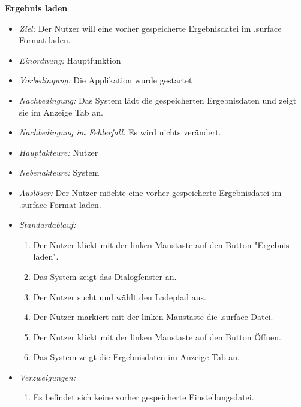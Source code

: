 \textbf{Ergebnis laden}
  \begin{itemize}
  \item \textit{Ziel:} Der Nutzer will eine vorher gespeicherte Ergebnisdatei im .surface Format laden.
  \item \textit{Einordnung:} Hauptfunktion
  \item \textit{Vorbedingung:} Die Applikation wurde gestartet
  \item \textit{Nachbedingung:} Das System l\"adt die gespeicherten Ergebnisdaten und zeigt sie im Anzeige Tab an.
    \item \textit{Nachbedingung im Fehlerfall:} Es wird nichts ver\"andert.
  \item \textit{Hauptakteure:} Nutzer
  \item \textit{Nebenakteure:} System
  \item \textit{Ausl\"oser:} Der Nutzer m\"ochte eine vorher gespeicherte Ergebnisdatei im .surface Format laden.
    \item \textit{Standardablauf:}
    \begin{enumerate}
    \item Der Nutzer klickt mit der linken Maustaste auf den Button "Ergebnis laden".
    \item Das System zeigt das Dialogfenster an.
    \item Der Nutzer sucht und w\"ahlt den Ladepfad aus.
    \item Der Nutzer markiert mit der linken Maustaste die .surface Datei.
    \item Der Nutzer klickt mit der linken Maustaste auf den Button \"Offnen.
    \item Das System zeigt die Ergebnisdaten im Anzeige Tab an.   
  \end{enumerate}
  \item \textit{Verzweigungen:}
    \begin{enumerate}[label=(3\arabic*)]
\item Es befindet sich keine vorher gespeicherte Einstellungsdatei.
    \end{enumerate}
  \end{itemize}